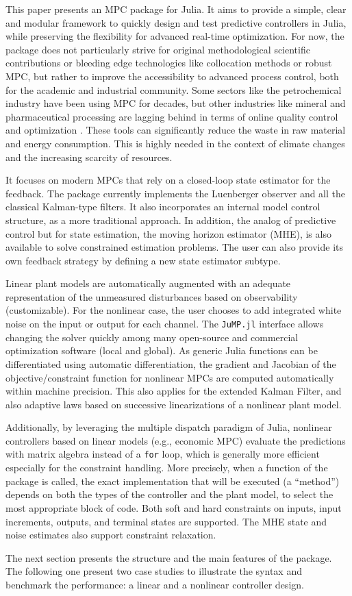 This paper presents an MPC package for Julia. It aims to provide a simple, clear and modular framework to quickly design and test predictive controllers in Julia, while preserving the flexibility for advanced real-time optimization. For now, the package does not particularly strive for original methodological scientific contributions or bleeding edge technologies like collocation methods or robust MPC, but rather to improve the accessibility to advanced process control, both for the academic and industrial community. Some sectors like the petrochemical industry have been using MPC for decades, but other industries like mineral and pharmaceutical processing are lagging behind in terms of online quality control and optimization \citep{gapMPC, gapMPC2}. These tools can significantly reduce the waste in raw material and energy consumption. This is highly needed in the context of climate changes and the increasing scarcity of resources.

It focuses on modern MPCs that rely on a closed-loop state estimator for the feedback. The package currently implements the Luenberger observer and all the classical Kalman-type filters. It also incorporates an internal model control structure, as a more traditional approach. In addition, the analog of predictive control but for state estimation, the moving horizon estimator (MHE), is also available to solve constrained estimation problems. The user can also provide its own feedback strategy by defining a new state estimator subtype.

Linear plant models are automatically augmented with an adequate representation of the unmeasured disturbances based on observability (customizable). For the nonlinear case, the user chooses to add integrated white noise on the input or output for each channel. The \texttt{JuMP.jl} interface allows changing the solver quickly among  many open-source and commercial optimization software (local and global). As generic Julia functions can be differentiated using automatic differentiation, the gradient and Jacobian of the objective/constraint function for nonlinear MPCs are computed automatically within machine precision. This also applies for the extended Kalman Filter, and also adaptive laws based on successive linearizations of a nonlinear plant model. 

Additionally, by leveraging the multiple dispatch paradigm of Julia, nonlinear controllers based on linear models (e.g., economic MPC) evaluate the predictions with matrix algebra instead of a \texttt{for} loop, which is generally more efficient especially for the constraint handling. More precisely, when a function of the package is called, the exact implementation that will be executed (a ``method'') depends on both the types of the controller and the plant model, to select the most appropriate block of code. Both soft and hard constraints on inputs, input increments, outputs, and terminal states are supported. The MHE state and noise estimates also support constraint relaxation.

The next section presents the structure and the main features of the package. The following one present two case studies to illustrate the syntax and benchmark the performance: a linear and a nonlinear controller design.
